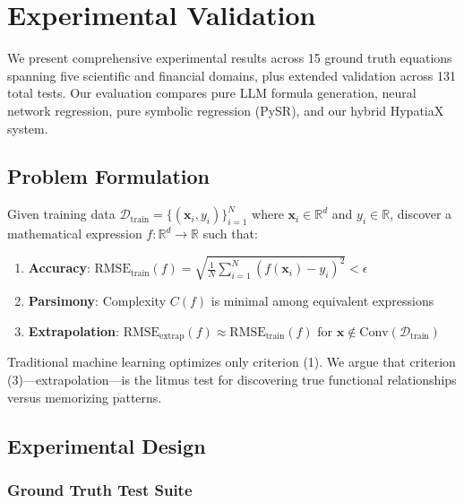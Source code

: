 
\section{Experimental Validation}
\label{sec:experiments}

We present comprehensive experimental results across 15 ground truth equations spanning five scientific and financial domains, plus extended validation across 131 total tests. Our evaluation compares pure LLM formula generation, neural network regression, pure symbolic regression (PySR), and our hybrid HypatiaX system.

\subsection{Problem Formulation}

\begin{definition}
Given training data $\mathcal{D}_{\text{train}} = \{(\mathbf{x}_i, y_i)\}_{i=1}^N$ where $\mathbf{x}_i \in \mathbb{R}^d$ and $y_i \in \mathbb{R}$, discover a mathematical expression $f: \mathbb{R}^d \to \mathbb{R}$ such that:
\begin{enumerate}
    \item \textbf{Accuracy}: $\text{RMSE}_{\text{train}}(f) = \sqrt{\frac{1}{N}\sum_{i=1}^N (f(\mathbf{x}_i) - y_i)^2} < \epsilon$
    \item \textbf{Parsimony}: Complexity $C(f)$ is minimal among equivalent expressions
    \item \textbf{Extrapolation}: $\text{RMSE}_{\text{extrap}}(f) \approx \text{RMSE}_{\text{train}}(f)$ for $\mathbf{x} \notin \text{Conv}(\mathcal{D}_{\text{train}})$
\end{enumerate}
\end{definition}

Traditional machine learning optimizes only criterion (1). We argue that criterion (3)---extrapolation---is the litmus test for discovering true functional relationships versus memorizing patterns.

\subsection{Experimental Design}

\subsubsection{Ground Truth Test Suite}

